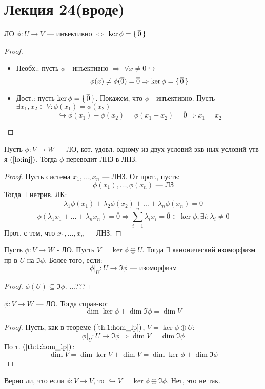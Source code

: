 \section{Лекция 24(вроде)}
\begin{statement}
  \label{lo:inj}
ЛО $\phi: U \rightarrow V$ --- инъективно $\iff$ $\ker \phi = \set{\overline{0}}$
\end{statement}
\begin{proof}
\begin{itemize}
  \item Необх.: пусть $\phi$ - инъективно $\Rightarrow$ $\forall x \neq \overline{0} \hookrightarrow$
    \[
    \phi(x) \neq \phi(\overline{0}) = \overline{0} \Rightarrow \ker \phi = \set{\overline{0}}
    \]
  \item Дост.: пусть $\ker \phi = \set{\overline{0}}$. Покажем, что $\phi$ - инъективно. Пусть $\exists x_1, x_2 \in V \colon \phi(x_1) = \phi(x_2)$
    \[
    \hookrightarrow \phi(x_1) - \phi(x_2) = \phi(x_1 - x_2) = \overline{0} \Rightarrow x_1 = x_2
    \]
\end{itemize}
\end{proof}
\begin{consequence}
Пусть $\phi \colon V \rightarrow W$ --- ЛО, кот. удовл. одному из двух условий экв-ных условий утв-я $(\ref{lo:inj})$. Тогда $\phi$ переводит ЛНЗ в ЛНЗ.
\end{consequence}
\begin{proof}
Пусть система $x_1, \ldots, x_n$ --- ЛНЗ. От прот., пусть:
\[
  \phi(x_1), \ldots, \phi(x_n) \text{ --- ЛЗ}
\]
Тогда $\exists$ нетрив. ЛК:
\[
\lambda_1 \phi(x_1) + \lambda_2 \phi(x_2) + \ldots + \lambda_n \phi(x_n) = \overline{0}
\]
\[
  \phi(\lambda_1 x_1 + \ldots + \lambda_n x_n) = \overline{0} \Rightarrow \sum_{i = 1}^{n} \lambda_i x_i = \overline{0} \in \ker \phi, \exists i \colon \lambda_i \neq 0
\]
Прот. с тем, что $x_1, \ldots, x_n$ --- ЛНЗ.
\end{proof}
\begin{theorem}
\label{th:1:hom_lp}
Пусть $\phi \colon V \rightarrow W$ - ЛО. Пусть $V = \ker \phi \oplus U$. Тогда $\exists$ канонический изоморфизм пр-в $U$ на $\Im \phi$. Более того, если:
\[
\phi|_U \colon U \rightarrow \Im \phi \text{ --- изоморфизм}
\]
\end{theorem}
\begin{proof}
$\phi(U) \subseteq \Im \phi$. 
...???
\end{proof}
\begin{theorem}
\label{th:2:ker_proj_lo}
$\phi \colon V \rightarrow W$ --- ЛО. Тогда справ-во:
\[
\dim \ker \phi + \dim \Im \phi = \dim V
\]
\end{theorem}
\begin{proof}
Пусть, как в теореме $(\ref{th:1:hom_lp})$, $V = \ker \phi \oplus U$:
\[
\phi|_U \colon U \rightarrow \Im \phi \Rightarrow \dim V = \dim \Im \phi
\]
По т. $(\ref{th:1:hom_lp})$:
\[
\dim V = \dim \ker V + \dim V = \dim \ker \phi + \dim \Im \phi
\]
\end{proof}
\begin{note}
  Верно ли, что если $\phi \colon V \rightarrow V$, то $\hookrightarrow V = \ker \phi \oplus \Im \phi$. Нет, это не так.
\end{note}


